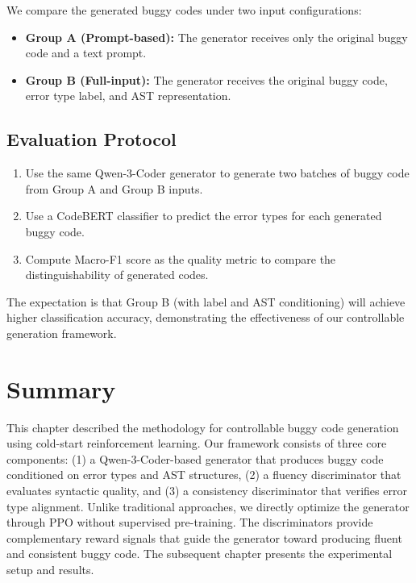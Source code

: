 We compare the generated buggy codes under two input configurations:

\begin{itemize}
    \item \textbf{Group A (Prompt-based):} The generator receives only the original buggy code and a text prompt.
    \item \textbf{Group B (Full-input):} The generator receives the original buggy code, error type label, and AST representation.
\end{itemize}

\subsection{Evaluation Protocol}

\begin{enumerate}
    \item Use the same Qwen-3-Coder generator to generate two batches of buggy code from Group A and Group B inputs.
    \item Use a CodeBERT classifier to predict the error types for each generated buggy code.
    \item Compute Macro-F1 score as the quality metric to compare the distinguishability of generated codes.
\end{enumerate}

The expectation is that Group B (with label and AST conditioning) will achieve higher classification accuracy, demonstrating the effectiveness of our controllable generation framework.

\section{Summary}

This chapter described the methodology for controllable buggy code generation using cold-start reinforcement learning. Our framework consists of three core components: (1) a Qwen-3-Coder-based generator that produces buggy code conditioned on error types and AST structures, (2) a fluency discriminator that evaluates syntactic quality, and (3) a consistency discriminator that verifies error type alignment. Unlike traditional approaches, we directly optimize the generator through PPO without supervised pre-training. The discriminators provide complementary reward signals that guide the generator toward producing fluent and consistent buggy code. The subsequent chapter presents the experimental setup and results.

\endgroup
\endinput
